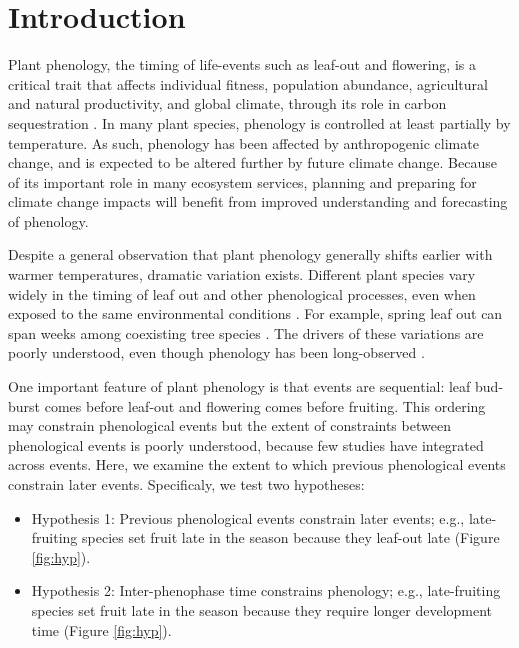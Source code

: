 \documentclass{article}
\begin{document}
\section* {Introduction}
Plant phenology, the timing of life-events such as leaf-out and flowering, is a critical trait that affects individual fitness, population abundance, agricultural and natural productivity, and global climate, through its role in carbon sequestration \citep{miller-rushing2008,primack2009a,willis2010,miller-rushing2010}. In many plant species, phenology is controlled at least partially by temperature. As such, phenology has been affected by anthropogenic climate change, and is expected to be altered further by future climate change\citep{parmesan2006}. Because of its important role in many ecosystem services, planning and preparing for climate change impacts will benefit from improved understanding and forecasting of phenology.
\par Despite a general observation that plant phenology generally shifts earlier with warmer temperatures, dramatic variation exists. Different plant species vary widely in the timing of leaf out and other phenological processes, even when exposed to the same environmental conditions \citep{lechowicz1984,primack2009c}. For example, spring leaf out can span weeks among coexisting tree species \citep{lechowicz1984}. The drivers of these variations are poorly understood, even though phenology has been long-observed \citep{wolkovich2014}.
\par One important feature of plant phenology is that events are sequential: leaf bud-burst comes before leaf-out and flowering comes before fruiting. This ordering may constrain phenological events but the extent of constraints between phenological events is poorly understood, because few studies have integrated across events. Here, we examine the extent to which previous phenological events constrain later events. Specificaly, we test two hypotheses:
\begin{itemize}
\item Hypothesis 1: Previous phenological events constrain later events; e.g., late-fruiting species set fruit late in the season because they leaf-out late  (Figure \ref{fig:hyp}).
\item Hypothesis 2: Inter-phenophase time  constrains phenology; e.g., late-fruiting species set fruit late in the season because they require longer development time (Figure \ref{fig:hyp}).
\end{itemize}
\end{document}
